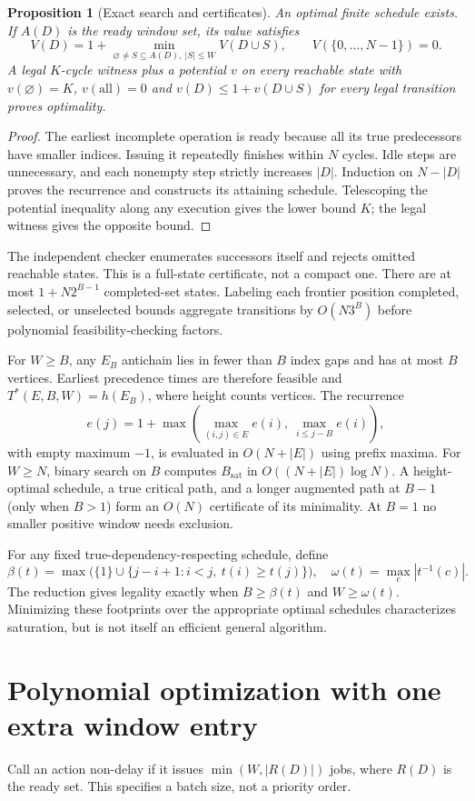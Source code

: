 \documentclass[11pt]{article}
\newtheorem{proposition}[theorem]{Proposition}
\newcommand{\T}{T^*}
\newcommand{\bs}{B_{\mathrm{sat}}}
\begin{document}
\begin{proposition}[Exact search and certificates]
An optimal finite schedule exists. If $A(D)$ is the ready window set, its
value satisfies
\[
 V(D)=1+\min_{\varnothing\ne S\subseteq A(D),\ |S|\le W}V(D\cup S),
 \qquad V(\{0,\ldots,N-1\})=0.
\]
A legal $K$-cycle witness plus a potential $v$ on every reachable state with
$v(\varnothing)=K$, $v(\mathrm{all})=0$ and
$v(D)\le1+v(D\cup S)$ for every legal transition proves optimality.
\end{proposition}
\begin{proof}
The earliest incomplete operation is ready because all its true predecessors
have smaller indices. Issuing it repeatedly finishes within $N$ cycles.
Idle steps are unnecessary, and each nonempty step strictly increases $|D|$.
Induction on $N-|D|$ proves the recurrence and constructs its attaining
schedule. Telescoping the potential inequality along any execution gives
the lower bound $K$; the legal witness gives the opposite bound.
\end{proof}
The independent checker enumerates successors itself and rejects omitted
reachable states. This is a full-state certificate, not a compact one.
There are at most $1+N2^{B-1}$ completed-set states. Labeling each frontier
position completed, selected, or unselected bounds aggregate transitions
by $O(N3^B)$ before polynomial feasibility-checking factors.

For $W\ge B$, any $E_B$ antichain lies in fewer than $B$ index gaps and has
at most $B$ vertices. Earliest precedence times are therefore feasible and
$\T(E,B,W)=h(E_B)$, where height counts vertices. The recurrence
\[
 e(j)=1+\max\left(\max_{(i,j)\in E}e(i),\ \max_{i\le j-B}e(i)\right),
\]
with empty maximum $-1$, is evaluated in $O(N+|E|)$ using prefix maxima.
For $W\ge N$, binary search on $B$ computes $\bs$ in
$O((N+|E|)\log N)$. A height-optimal schedule, a true critical path, and a
longer augmented path at $B-1$ (only when $B>1$) form an $O(N)$ certificate
of its minimality. At $B=1$ no smaller positive window needs exclusion.

For any fixed true-dependency-respecting schedule, define
\[
 \beta(t)=\max\bigl(\{1\}\cup
 \{j-i+1:i<j,\ t(i)\ge t(j)\}\bigr),\quad
 \omega(t)=\max_c|t^{-1}(c)|.
\]
The reduction gives legality exactly when $B\ge\beta(t)$ and
$W\ge\omega(t)$. Minimizing these footprints over the appropriate optimal
schedules characterizes saturation, but is not itself an efficient general
algorithm.

\section{Polynomial optimization with one extra window entry}
Call an action non-delay if it issues $\min(W,|R(D)|)$ jobs, where $R(D)$
is the ready set. This specifies a batch size, not a priority order.
\end{document}
